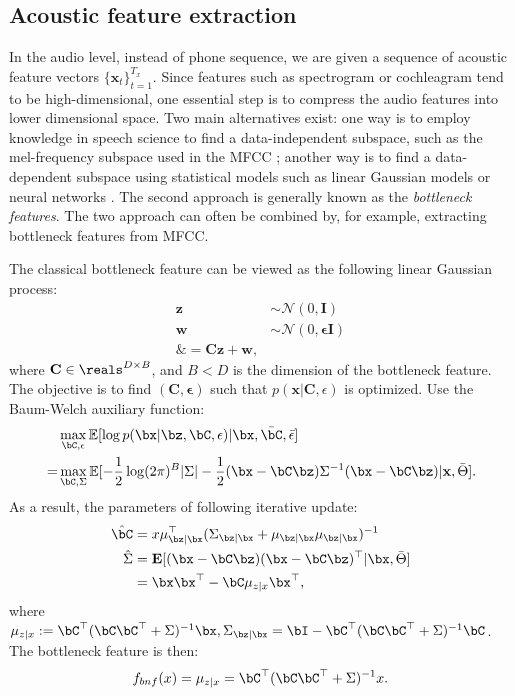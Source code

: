 \subsection{Acoustic feature extraction}
In the audio level, instead of phone sequence, we are given a sequence of acoustic feature vectors $\{\mathbf x_t\}_{t=1}^{T_x}$.  
Since features such as spectrogram or cochleagram tend to be high-dimensional, one essential step is to compress the audio features into lower dimensional space. Two main alternatives exist: one way is to employ knowledge in speech science to find a data-independent subspace, such as the mel-frequency subspace used in the MFCC ; another way is to find a data-dependent subspace using statistical models such as linear Gaussian models \cite{Roweis1997} or neural networks \cite{Fer2017}. The second approach is generally known as the \textit{bottleneck features}. The two approach can often be combined by, for example, extracting bottleneck features from MFCC.

The classical bottleneck feature can be viewed as the following linear Gaussian process:
\begin{align}\label{eq:bnf_gp}
    \mathbf z &\sim \mathcal N(0, \mathbf I)\\
    \mathbf w &\sim \mathcal N(0, \mathbf \epsilon \mathbf I)\\
    \mathbf  &= \mathbf C \mathbf z + \mathbf w,
\end{align}
where $\mathbf C \in \reals^{D \times B}$, and $B < D$ is the dimension of the bottleneck feature. The objective is to find $(\mathbf C, \mathbf\epsilon)$ such that $p(\mathbf x|\mathbf C, \epsilon)$ is optimized. Use the Baum-Welch auxiliary function:
\begin{align}\label{eq:lg_bnf_objective}
    &\max_{\bC, \epsilon} \mathbb E[\log p(\bx|\bz, \bC, \epsilon)|\bx, \bar\bC, \bar\epsilon]\\
    =&\max_{\bC, \Sigma}\mathbb E[-\frac{1}{2}\log (2\pi)^{B}|\Sigma| - \frac{1}{2}(\bx - \bC\bz) \Sigma^{-1}(\bx - \bC\bz)|\mathbf x, \bar\Theta].
\end{align}
As a result, the parameters of following iterative update:
\begin{align}
    \hat{\bC} &= x \mu_{\bz|\bx}^\top(\Sigma_{\bz|\bx} + \mu_{\bz|\bx}\mu_{\bz|\bx})^{-1}\\
    \hat{\Sigma} &= \mathbf E[(\bx - \bC \bz)(\bx - \bC \bz)^\top|\bx, \bar\Theta]\\
    &= \bx \bx^\top - \bC \mu_{z|x} \bx^\top,
\end{align}
where $\mu_{z|x} := \bC^\top(\bC \bC^\top + \Sigma)^{-1} \bx, \Sigma_{\bz|\bx} = \bI - \bC^\top(\bC \bC^\top + \Sigma)^{-1}\bC$. The bottleneck feature is then:
\begin{align}\label{eq:lg_bnf}
    f_{bnf}(x) = \mu_{z|x} = \bC^\top(\bC\bC^\top + \Sigma)^{-1} x.
\end{align}

